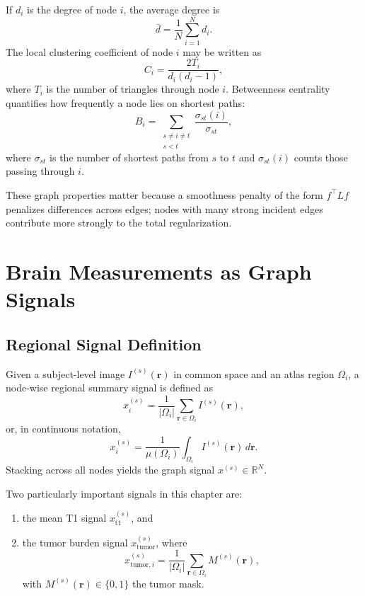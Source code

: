 If \(d_i\) is the degree of node \(i\), the average degree is
\begin{equation}
\bar d = \frac{1}{N}\sum_{i=1}^{N} d_i.
\end{equation}
The local clustering coefficient of node \(i\) may be written as
\begin{equation}
C_i = \frac{2T_i}{d_i(d_i-1)},
\end{equation}
where \(T_i\) is the number of triangles through node \(i\). Betweenness centrality quantifies how frequently a node lies on shortest paths:
\begin{equation}
B_i = \sum_{\substack{s\neq i\neq t\\ s<t}} \frac{\sigma_{st}(i)}{\sigma_{st}},
\end{equation}
where \(\sigma_{st}\) is the number of shortest paths from \(s\) to \(t\) and \(\sigma_{st}(i)\) counts those passing through \(i\).

These graph properties matter because a smoothness penalty of the form \(f^\top L f\) penalizes differences across edges; nodes with many strong incident edges contribute more strongly to the total regularization.

\section{Brain Measurements as Graph Signals}
\label{sec:ch4_signals} %

\subsection{Regional Signal Definition}

Given a subject-level image \(I^{(s)}(\mathbf{r})\) in common space and an atlas region \(\Omega_i\), a node-wise regional summary signal is defined as
\begin{equation}
x_i^{(s)}
=
\frac{1}{|\Omega_i|}
\sum_{\mathbf{r}\in\Omega_i} I^{(s)}(\mathbf{r}),
\end{equation}
or, in continuous notation,
\begin{equation}
x_i^{(s)}
=
\frac{1}{\mu(\Omega_i)} \int_{\Omega_i} I^{(s)}(\mathbf{r})\,d\mathbf{r}.
\end{equation}
Stacking across all nodes yields the graph signal \(x^{(s)} \in \mathbb{R}^{N}\).

Two particularly important signals in this chapter are:
\begin{enumerate}[label=(\alph*)] %
    \item the mean T1 signal \(x_{\mathrm{t1}}^{(s)}\), and
    \item the tumor burden signal \(x_{\mathrm{tumor}}^{(s)}\), where
    \begin{equation}
    x^{(s)}_{\mathrm{tumor},i}
    =
    \frac{1}{|\Omega_i|}
    \sum_{\mathbf{r}\in\Omega_i} M^{(s)}(\mathbf{r}),
    \end{equation}
    with \(M^{(s)}(\mathbf{r})\in\{0,1\}\) the tumor mask.
\end{enumerate}

